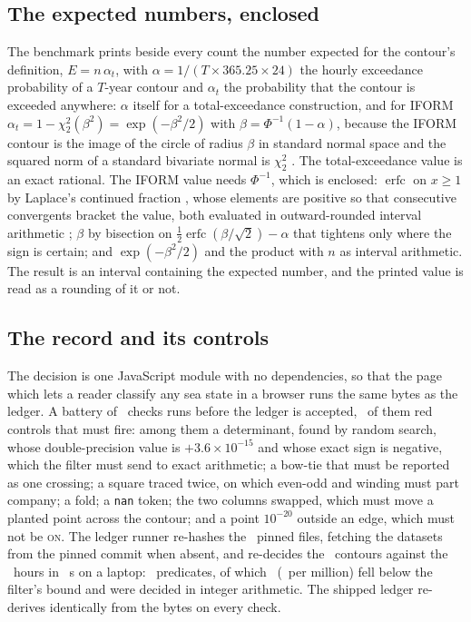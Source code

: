 \documentclass[preprint,11pt,authoryear]{elsarticle}
\begin{document}
\subsection{The expected numbers, enclosed}\label{sec:expected}
The benchmark prints beside every count the number expected for the contour's definition, $E = n\,\alpha_t$, with $\alpha = 1/(T \times 365.25 \times 24)$ the hourly exceedance probability of a $T$-year contour and $\alpha_t$ the probability that the contour is exceeded anywhere: $\alpha$ itself for a total-exceedance construction, and for IFORM $\alpha_t = 1 - \chi^2_2(\beta^2) = \exp(-\beta^2/2)$ with $\beta = \Phi^{-1}(1 - \alpha)$, because the IFORM contour is the image of the circle of radius $\beta$ in standard normal space and the squared norm of a standard bivariate normal is $\chi^2_2$ \citep{haselsteiner2021,mackay2021}. The total-exceedance value is an exact rational. The IFORM value needs $\Phi^{-1}$, which is enclosed: $\operatorname{erfc}$ on $x \geq 1$ by Laplace's continued fraction \citep[\S7.1.14]{abramowitz1964}, whose elements are positive so that consecutive convergents bracket the value, both evaluated in outward-rounded interval arithmetic \citep{moore2009,rump2010}; $\beta$ by bisection on $\tfrac12\operatorname{erfc}(\beta/\sqrt2) - \alpha$ that tightens only where the sign is certain; and $\exp(-\beta^2/2)$ and the product with $n$ as interval arithmetic. The result is an interval containing the expected number, and the printed value is read as a rounding of it or not.

\subsection{The record and its controls}
The decision is one JavaScript module with no dependencies, so that the page which lets a reader classify any sea state in a browser runs the same bytes as the ledger. A battery of \EBatteryChecks\ checks runs before the ledger is accepted, \EBatteryReds\ of them red controls that must fire: among them a determinant, found by random search, whose double-precision value is $+3.6 \times 10^{-15}$ and whose exact sign is negative, which the filter must send to exact arithmetic; a bow-tie that must be reported as one crossing; a square traced twice, on which even-odd and winding must part company; a fold; a \texttt{nan} token; the two columns swapped, which must move a planted point across the contour; and a point $10^{-20}$ outside an edge, which must not be \textsc{on}. The ledger runner re-hashes the \ECorpusFiles\ pinned files, fetching the datasets from the pinned commit when absent, and re-decides the \EContours\ contours against the \EHoursTotal\ hours in \ESeconds\ s on a laptop: \EPredicates\ predicates, of which \EExactPredicates\ (\EExactPredicatesPerMillion\ per million) fell below the filter's bound and were decided in integer arithmetic. The shipped ledger re-derives identically from the bytes on every check.
\end{document}
